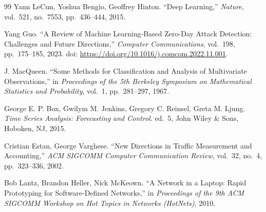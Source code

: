 \begin{thebibliography}{99}
 Yann LeCun, Yoshua Bengio, Geoffrey Hinton. ``Deep Learning,'' \emph{Nature}, vol.~521, no.~7553, pp.~436--444, 2015.

 Yang Guo. ``A Review of Machine Learning-Based Zero-Day Attack Detection: Challenges and Future Directions,'' \emph{Computer Communications}, vol.~198, pp.~175--185, 2023. doi: \url{https://doi.org/10.1016/j.comcom.2022.11.001}.

 J. MacQueen. ``Some Methods for Classification and Analysis of Multivariate Observations,'' in \emph{Proceedings of the 5th Berkeley Symposium on Mathematical Statistics and Probability}, vol.~1, pp.~281--297, 1967.

 George E. P. Box, Gwilym M. Jenkins, Gregory C. Reinsel, Greta M. Ljung. \emph{Time Series Analysis: Forecasting and Control}. ed.~5, John Wiley \& Sons, Hoboken, NJ, 2015.

 Cristian Estan, George Varghese. ``New Directions in Traffic Measurement and Accounting,'' \emph{ACM SIGCOMM Computer Communication Review}, vol.~32, no.~4, pp.~323--336, 2002.

 Bob Lantz, Brandon Heller, Nick McKeown. ``A Network in a Laptop: Rapid Prototyping for Software-Defined Networks,'' in \emph{Proceedings of the 9th ACM SIGCOMM Workshop on Hot Topics in Networks (HotNets)}, 2010.

\end{thebibliography}
\endgroup
